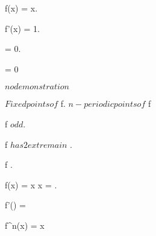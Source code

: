 \documentclass[../Main/main]{subfiles}
\begin{document}
{{{			f(x) = x.

			f'(x) = 1.

			 = 0.

			 = 0
		}
		\demonstration
		{
			$ no demonstration $
		}
	}
	
	
	{
		{
		}
		\study
		{
			$Fixed points of $ f.
			$n-periodic points of $ f
		}
		\demonstration
		{
			{
				f $ odd $.

				f $ has 2 extrema in $ .

				f .
			}


			{
				f(x) = x \ifandonlyif x = \pm {}.

				f'(\pm {})  = 
			}

			{
				f^n(x) = x 
			}
		}
	}
	
	
	
	
	
	
		

}
\end{document}
